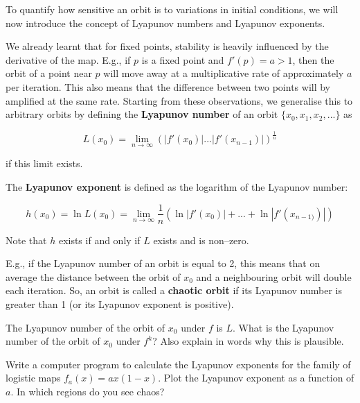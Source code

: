 To quantify how sensitive an orbit is to variations in initial conditions, we will now introduce the concept of Lyapunov numbers and Lyapunov exponents.

We already learnt that for fixed points, stability is heavily influenced by the derivative of the map. E.g., if $p$ is a fixed point and $f'(p)=a > 1$, then the orbit of a point near $p$ will move away at a multiplicative rate of approximately $a$ per iteration. This also means that the difference between two points will by amplified at the same rate. Starting from these observations, we generalise this to arbitrary orbits by defining the \textbf{Lyapunov number} of an orbit $\{x_0, x_1, x_2, ... \}$ as

\begin{equation}
L(x_0) = \lim _{n \to \infty}\left(\left|f'(x_0)\right|...\left|f'(x_{n-1})\right|\right)^{\frac{1}{n}}
\end{equation} 

if this limit exists.

The \textbf{Lyapunov exponent} is defined as the logarithm of the Lyapunov number:

\begin{equation}
h(x_0) = \ln L(x_0) = \lim _{n \to \infty}\frac{1}{n}\left(\ln\left|f'(x_0)\right| + ... + \ln\left|f'(x_{n-1)})\right|\right)
\end{equation} 

Note that $h$ exists if and only if $L$ exists and is non--zero.

E.g., if the Lyapunov number of an orbit is equal to 2, this means that on average the distance between the orbit of $x_0$ and a neighbouring orbit will double each iteration. So, an orbit is called a \textbf{chaotic orbit} if its Lyapunov number is greater than 1 (or its Lyapunov exponent is positive). 




\begin{exer}
The Lyapunov number of the orbit of $x_0$ under $f$ is $L$. What is the Lyapunov number of the orbit of $x_0$ under $f^k$? Also explain in words why this is plausible.
\end{exer}

\begin{exer}
Write a computer program to calculate the Lyapunov exponents for the family of logistic maps $f_a(x)=ax(1-x)$. Plot the Lyapunov exponent as a function of $a$. In which regions do you see chaos?
\end{exer}



